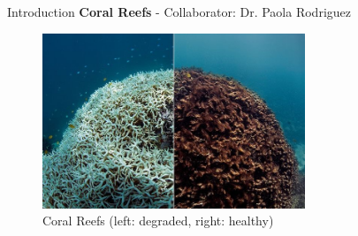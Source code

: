 




\begin{frame}{Introduction}
        \textbf{Coral Reefs} - Collaborator: Dr. Paola Rodriguez
        \begin{figure}
            \includegraphics[height=0.7\textheight,width=0.7\textwidth,keepaspectratio]{images/aid_2.jpg}
            \caption{Coral Reefs (left: degraded, right: healthy)}
        \end{figure}
    \end{frame}

